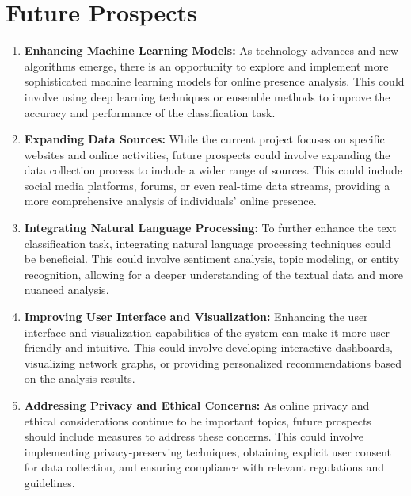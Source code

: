\documentclass[openany]{report}
\begin{document}
\chapter{Future Prospects}
\begin{enumerate}
    \item \textbf{Enhancing Machine Learning Models:} As technology advances and new algorithms emerge, there is an opportunity to explore and implement more sophisticated machine learning models for online presence analysis. This could involve using deep learning techniques or ensemble methods to improve the accuracy and performance of the classification task.

    \item \textbf{Expanding Data Sources:} While the current project focuses on specific websites and online activities, future prospects could involve expanding the data collection process to include a wider range of sources. This could include social media platforms, forums, or even real-time data streams, providing a more comprehensive analysis of individuals' online presence.

    \item \textbf{Integrating Natural Language Processing:} To further enhance the text classification task, integrating natural language processing techniques could be beneficial. This could involve sentiment analysis, topic modeling, or entity recognition, allowing for a deeper understanding of the textual data and more nuanced analysis.

    \item \textbf{Improving User Interface and Visualization:} Enhancing the user interface and visualization capabilities of the system can make it more user-friendly and intuitive. This could involve developing interactive dashboards, visualizing network graphs, or providing personalized recommendations based on the analysis results.

    \item \textbf{Addressing Privacy and Ethical Concerns:} As online privacy and ethical considerations continue to be important topics, future prospects should include measures to address these concerns. This could involve implementing privacy-preserving techniques, obtaining explicit user consent for data collection, and ensuring compliance with relevant regulations and guidelines.
\end{enumerate}
\end{document}
